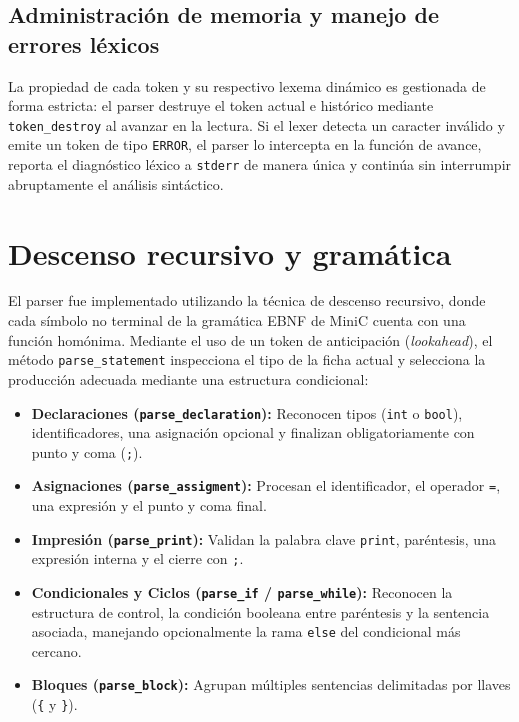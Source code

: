 \documentclass[12pt, letterpaper]{article}
\begin{document}
\subsection{Administración de memoria y manejo de errores léxicos}
La propiedad de cada token y su respectivo lexema dinámico es gestionada de forma estricta: el parser destruye el token actual e histórico mediante \texttt{token\_destroy} al avanzar en la lectura. Si el lexer detecta un caracter inválido y emite un token de tipo \texttt{ERROR}, el parser lo intercepta en la función de avance, reporta el diagnóstico léxico a \texttt{stderr} de manera única y continúa sin interrumpir abruptamente el análisis sintáctico.

\section{Descenso recursivo y gramática}
El parser fue implementado utilizando la técnica de descenso recursivo, donde cada símbolo no terminal de la gramática EBNF de MiniC cuenta con una función homónima. Mediante el uso de un token de anticipación (\textit{lookahead}), el método \texttt{parse\_statement} inspecciona el tipo de la ficha actual y selecciona la producción adecuada mediante una estructura condicional:
\begin{itemize}
    \item \textbf{Declaraciones (\texttt{parse\_declaration}):} Reconocen tipos (\texttt{int} o \texttt{bool}), identificadores, una asignación opcional y finalizan obligatoriamente con punto y coma (\texttt{;}).
    \item \textbf{Asignaciones (\texttt{parse\_assigment}):} Procesan el identificador, el operador \texttt{=}, una expresión y el punto y coma final.
    \item \textbf{Impresión (\texttt{parse\_print}):} Validan la palabra clave \texttt{print}, paréntesis, una expresión interna y el cierre con \texttt{;}.
    \item \textbf{Condicionales y Ciclos (\texttt{parse\_if} / \texttt{parse\_while}):} Reconocen la estructura de control, la condición booleana entre paréntesis y la sentencia asociada, manejando opcionalmente la rama \texttt{else} del condicional más cercano.
    \item \textbf{Bloques (\texttt{parse\_block}):} Agrupan múltiples sentencias delimitadas por llaves (\texttt{\{} y \texttt{\}}).
\end{itemize}
\end{document}
